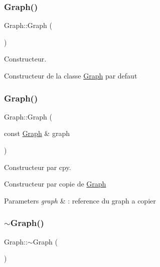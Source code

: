 \subsubsection{\texorpdfstring{Graph()}{Graph()}\hspace{0.1cm}{\footnotesize\ttfamily [1/2]}}
{\footnotesize\ttfamily Graph\+::\+Graph (\begin{DoxyParamCaption}{ }\end{DoxyParamCaption})}



Constructeur. 

Constructeur de la classe \mbox{\hyperlink{class_graph}{Graph}} par defaut \mbox{\label{class_graph_af67de98565b93f81f3766649b567e662}} 
\subsubsection{\texorpdfstring{Graph()}{Graph()}\hspace{0.1cm}{\footnotesize\ttfamily [2/2]}}
{\footnotesize\ttfamily Graph\+::\+Graph (\begin{DoxyParamCaption}\item[{const \mbox{\hyperlink{class_graph}{Graph}} \&}]{graph }\end{DoxyParamCaption})}



Constructeur par cpy. 

Constructeur par copie de \mbox{\hyperlink{class_graph}{Graph}}


\begin{DoxyParams}{Parameters}
{\em graph} & \+: reference du graph a copier \\
\hline
\end{DoxyParams}
\mbox{\label{class_graph_a902c5b3eacb66d60752525ab23297a95}} 
\subsubsection{\texorpdfstring{$\sim$\+Graph()}{~Graph()}}
{\footnotesize\ttfamily Graph\+::$\sim$\+Graph (\begin{DoxyParamCaption}{ }\end{DoxyParamCaption})}



